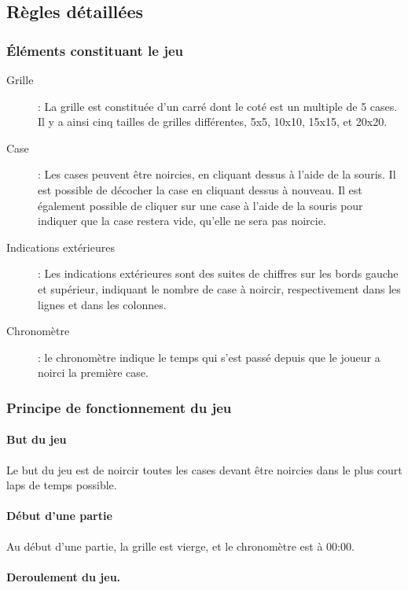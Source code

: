 \documentclass[11pt]{article}
\begin{document}
\subsection{Règles détaillées}

\subsubsection{Éléments constituant le jeu}

    \begin{description}
        \item[Grille] : La grille est constituée d'un carré dont le coté est un multiple de 5 cases. Il y a ainsi cinq
            tailles de grilles différentes, 5x5, 10x10, 15x15, et 20x20.
        \item[Case] : Les cases peuvent être noircies, en cliquant dessus à l'aide de la souris. Il est possible de décocher la case en cliquant dessus à nouveau. Il est également possible de cliquer sur une case à l'aide de la souris pour indiquer que la case restera vide, qu'elle ne sera pas noircie.
        \item[Indications extérieures] : Les indications extérieures sont des suites de chiffres sur les bords gauche et supérieur, indiquant le nombre de case à noircir, respectivement dans les lignes et dans les colonnes.
        \item[Chronomètre] : le chronomètre indique le temps qui s'est passé depuis que le joueur a noirci la première case.
    \end{description}

\subsubsection{Principe de fonctionnement du jeu}

\paragraph{But du jeu}
Le but du jeu est de noircir toutes les cases devant être noircies dans le plus court laps de temps possible.

\paragraph{Début d'une partie}

Au début d'une partie, la grille est vierge, et le chronomètre est à 00:00.
\paragraph{Deroulement du jeu.}
\end{document}
